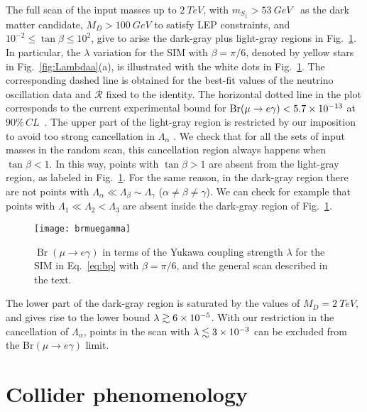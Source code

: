 The full scan of the input masses up to $\SI{2}{TeV}$, with
$m_{S_1}>\SI{53}{GeV}$~\cite{Abe:2014gua} as the dark matter candidate,
$M_D>\SI{100}{GeV}$ to satisfy LEP constraints, and
$10^{-2}\le\tan\beta\le 10^2$, give to arise the dark-gray plus
light-gray regions in Fig.~\ref{fig:brmuegamma}. In particular, the
$\lambda$ variation for the SIM with $\beta=\pi/6$, denoted by yellow
stars in Fig.~\ref{fig:Lambdaa}(a), is illustrated
with the white dots in Fig.~\ref{fig:brmuegamma}.   The
corresponding dashed line is obtained for the best-fit values of the
neutrino oscillation data and $\boldsymbol{\mathcal{R}}$ fixed to the
identity. The horizontal dotted line in the plot corresponds to the
current experimental bound for $\operatorname{Br}(\mu\to e
\gamma)<\num{5.7E-13}$ at $90\%\,\si{CL}$~\cite{Adam:2013mnn}.  
The upper part of the 
light-gray region is restricted by our imposition to avoid too strong
cancellation in  $\Lambda_{\alpha}$ . We check that for all the sets of
input masses in the random scan, this cancellation region always
happens when $\tan\beta<1$. In this way, points with $\tan\beta>1$ are
absent from the light-gray region, as labeled in
Fig.~\ref{fig:brmuegamma}. For the same reason, in the dark-gray
region there are not points with $\Lambda_{\alpha}\ll
\Lambda_{\beta}\sim \Lambda_\gamma$ ($\alpha\ne\beta\ne\gamma$). We can check for example that
points with $\Lambda_1\ll \Lambda_2<\Lambda_3$ are absent inside the
dark-gray region of Fig.~\ref{fig:brmuegamma}.


\begin{figure}
  \centering
  \texttt{[image: brmuegamma]}
  \caption{$\operatorname{Br}(\mu \rightarrow e \gamma)$ in terms of
    the Yukawa coupling strength $\lambda$ for the SIM in
    Eq.~\eqref{eq:bp} with $\beta=\pi/6$, and the general scan
    described in the text.}
  \label{fig:brmuegamma}
\end{figure}



The lower part of the dark-gray region is saturated by the values of
$M_{D}=\SI{2}{TeV}$, and gives rise to the lower bound $\lambda\gtrsim
\num{6E-5}$. 
With our restriction in the cancellation of
$\Lambda_{\alpha}$,  points in the scan with $\lambda\lesssim\num{3E-3}$ 
can be excluded from the Br$(\mu\to e\gamma)$ limit.    


\section{Collider phenomenology}
\label{sec:collider-phenomenology}

